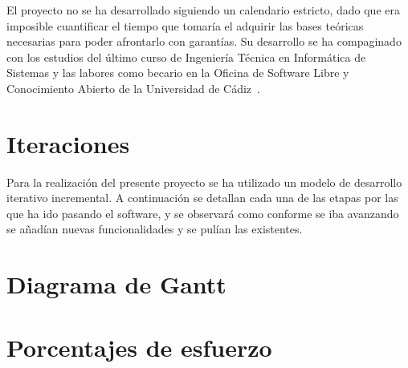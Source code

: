 El proyecto no se ha desarrollado siguiendo un calendario estricto,
dado que era imposible cuantificar el tiempo que tomaría el adquirir
las bases teóricas necesarias para poder afrontarlo con garantías. Su
desarrollo se ha compaginado con los estudios del último curso de
Ingeniería Técnica en Informática de Sistemas y las labores como
becario en la Oficina de Software Libre y Conocimiento Abierto de la
Universidad de Cádiz~\cite{osluca}.

\section{Iteraciones}

Para la realización del presente proyecto se ha utilizado un modelo de
desarrollo iterativo incremental. A continuación se detallan cada una
de las etapas por las que ha ido pasando el software, y se observará
como conforme se iba avanzando se añadían nuevas funcionalidades y se
pulían las existentes.

\section{Diagrama de Gantt}

\section{Porcentajes de esfuerzo}


